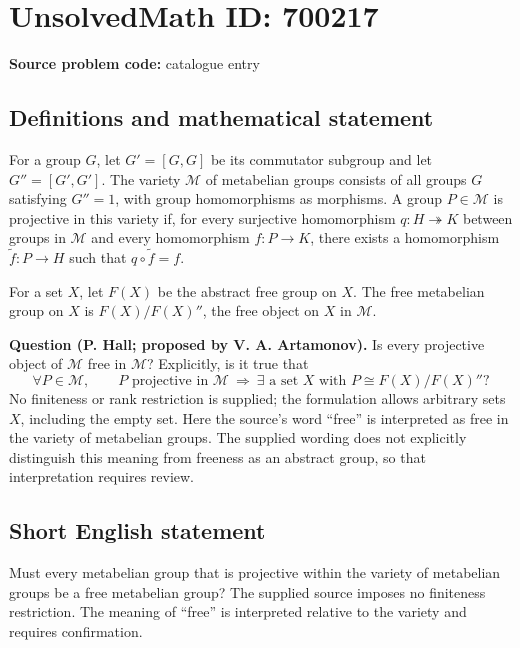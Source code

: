 \documentclass[11pt]{article}
\begin{document}
\section*{UnsolvedMath ID: 700217}
\textbf{Source problem code:} catalogue entry
\subsection{Definitions and mathematical statement}
For a group \(G\), let \(G'=[G,G]\) be its commutator subgroup and let \(G''=[G',G']\). The variety \(\mathcal M\) of metabelian groups consists of all groups \(G\) satisfying \(G''=1\), with group homomorphisms as morphisms. A group \(P\in\mathcal M\) is projective in this variety if, for every surjective homomorphism \(q:H\twoheadrightarrow K\) between groups in \(\mathcal M\) and every homomorphism \(f:P\to K\), there exists a homomorphism \(\widetilde f:P\to H\) such that \(q\circ\widetilde f=f\).

For a set \(X\), let \(F(X)\) be the abstract free group on \(X\). The free metabelian group on \(X\) is \(F(X)/F(X)''\), the free object on \(X\) in \(\mathcal M\).

\textbf{Question (P. Hall; proposed by V. A. Artamonov).} Is every projective object of \(\mathcal M\) free in \(\mathcal M\)? Explicitly, is it true that
\[
\forall P\in\mathcal M,\qquad
P\text{ projective in }\mathcal M
\ \Longrightarrow\ 
\exists\text{ a set }X\text{ with }P\cong F(X)/F(X)''?
\]
No finiteness or rank restriction is supplied; the formulation allows arbitrary sets \(X\), including the empty set. Here the source's word ``free'' is interpreted as free in the variety of metabelian groups. The supplied wording does not explicitly distinguish this meaning from freeness as an abstract group, so that interpretation requires review.
\subsection{Short English statement}
Must every metabelian group that is projective within the variety of metabelian groups be a free metabelian group? The supplied source imposes no finiteness restriction. The meaning of ``free'' is interpreted relative to the variety and requires confirmation.
\end{document}
